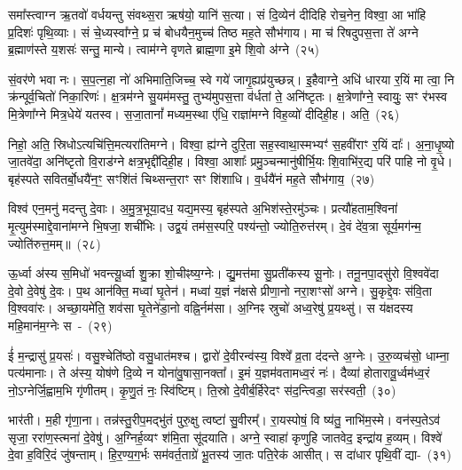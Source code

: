 {\anuvakamend[{पत्नी॑रि॒माꣳ रु॒द्रास्त्वाऽऽ च्छृ॑न्द॒न्त्वेका॒न्नविꣳ॑श॒तिश्च॑}]}%

समा᳚स्त्वाग्न ऋ॒तवो॑ वर्धयन्तु संवथ्स॒रा ऋष॑यो॒ यानि॑ स॒त्या। सं दि॒व्येन॑ दीदिहि रोच॒नेन॒ विश्वा॒ आ भा॑हि प्र॒दिशः॑ पृथि॒व्याः। सं चे॒ध्यस्वा᳚ग्ने॒ प्र च॑ बोधयैन॒मुच्च॑ तिष्ठ मह॒ते सौभ॑गाय। मा च॑ रिषदुपस॒त्ता ते॑ अग्ने ब्र॒ह्माण॑स्ते य॒शसः॑ सन्तु॒ मान्ये। त्वाम॑ग्ने वृणते ब्राह्म॒णा इ॒मे शि॒वो अ॑ग्ने~(२५)

सं॒वर॑णे भवा नः। स॒प॒त्न॒हा नो॑ अभिमाति॒जिच्च॒ स्वे गये॑ जागृ॒ह्यप्र॑युच्छन्न्। इ॒हैवाग्ने॒ अधि॑ धारया र॒यिं मा त्वा॒ नि क्र॑न्पूर्व॒चितो॑ निका॒रिणः॑। क्ष॒त्रम॑ग्ने सु॒यम॑मस्तु॒ तुभ्य॑मुपस॒त्ता व॑र्धतां ते॒ अनि॑ष्टृतः। क्ष॒त्रेणा᳚ग्ने॒ स्वायुः॒ सꣳ र॑भस्व मि॒त्रेणा᳚ग्ने मित्र॒धेये॑ यतस्व। स॒जा॒तानां᳚ मध्यम॒स्था ए॑धि॒ राज्ञा॑मग्ने विह॒व्यो॑ दीदिही॒ह। अति॒~(२६)

निहो॒ अति॒ स्रिधो\-ऽत्यचि॑त्ति॒मत्यरा॑तिमग्ने। विश्वा॒ ह्य॑ग्ने दुरि॒ता सह॒स्वाथा॒स्मभ्यꣳ॑ स॒हवी॑राꣳ र॒यिं दाः᳚। अ॒ना॒धृ॒ष्यो जा॒तवे॑दा॒ अनि॑ष्टृतो वि॒राड॑ग्ने क्षत्र॒भृद्दी॑दिही॒ह। विश्वा॒ आशाः᳚ प्रमु॒ञ्चन्मानु॑षीर्भि॒यः शि॒वाभि॑र॒द्य परि॑ पाहि नो वृ॒धे। बृह॑स्पते सवितर्बो॒धयै॑न॒ꣳ॒ सꣳशि॑तं चिथ्सन्त॒राꣳ सꣳ शि॑शाधि। व॒र्धयै॑नं मह॒ते सौभ॑गाय॒~(२७)

विश्व॑ एन॒मनु॑ मदन्तु दे॒वाः। अ॒मु॒त्र॒भूया॒दध॒ यद्य॒मस्य॒ बृह॑स्पते अ॒भिश॑स्ते॒रमु॑ञ्चः। प्रत्यौ॑हताम॒श्विना॑ मृ॒त्युम॑स्माद्दे॒वाना॑मग्ने भि॒षजा॒ शची॑भिः। उद्व॒यं तम॑स॒स्परि॒ पश्य॑न्तो॒ ज्योति॒रुत्त॑रम्। दे॒वं दे॑व॒त्रा सूर्य॒मग॑न्म॒ ज्योति॑रुत्त॒मम्॥~(२८)

{\anuvakamend[{इ॒मे शि॒वो अ॒ग्ने\-ऽति॒ सौभ॑गाय॒ चतु॑स्त्रिꣳशच्च}]}%

ऊ॒र्ध्वा अ॑स्य स॒मिधो॑ भवन्त्यू॒र्ध्वा शु॒क्रा शो॒चीꣴष्य॒ग्नेः। द्यु॒मत्त॑मा सु॒प्रती॑कस्य सू॒नोः। तनू॒नपा॒दसु॑रो वि॒श्ववे॑दा दे॒वो दे॒वेषु॑ दे॒वः। प॒थ आन॑क्ति॒ मध्वा॑ घृ॒तेन॑। मध्वा॑ य॒ज्ञं न॑क्षसे प्रीणा॒नो नरा॒शꣳसो॑ अग्ने। सु॒कृद्दे॒वः स॑वि॒ता वि॒श्ववा॑रः। अच्छा॒यमे॑ति॒ शव॑सा घृ॒तेने॑डा॒नो वह्नि॒र्नम॑सा। अ॒ग्निꣴ स्रुचो॑ अध्व॒रेषु॑ प्र॒यथ्सु॑। स य॑क्षदस्य महि॒मान॑म॒ग्नेः स~-~(२९)

ई॑ म॒न्द्रासु॑ प्र॒यसः॑। वसु॒श्चेति॑ष्ठो वसु॒धात॑मश्च। द्वारो॑ दे॒वीरन्व॑स्य॒ विश्वे᳚ व्र॒ता द॑दन्ते अ॒ग्नेः। उ॒रु॒व्यच॑सो॒ धाम्ना॒ पत्य॑मानाः। ते अ॑स्य॒ योष॑णे दि॒व्ये न योना॑वु॒षासा॒नक्ता᳚। इ॒मं य॒ज्ञम॑वतामध्व॒रं नः॑। दैव्या॑ होतारावू॒र्ध्वम॑ध्व॒रं नो॒\-ऽग्नेर्जि॒ह्वाम॒भि गृ॑णीतम्। कृ॒णु॒तं नः॒ स्वि॑ष्टिम्। ति॒स्रो दे॒वीर्ब॒र्हिरेदꣳ स॑द॒न्त्विडा॒ सर॑स्वती॒~(३०)

भार॑ती। म॒ही गृ॑णा॒ना। तन्न॑स्तु॒रीप॒मद्भु॑तं पुरु॒क्षु त्वष्टा॑ सु॒वीरम्᳚। रा॒यस्पोषं॒ वि ष्य॑तु॒ नाभि॑म॒स्मे। वन॑स्प॒ते\-ऽव॑ सृजा॒ ररा॑ण॒स्त्मना॑ दे॒वेषु॑। अ॒ग्निर्\mbox{}ह॒व्यꣳ श॑मि॒ता सू॑दयाति। अग्ने॒ स्वाहा॑ कृणुहि जातवेद॒ इन्द्रा॑य ह॒व्यम्। विश्वे॑ दे॒वा ह॒विरि॒दं जु॑षन्ताम्। हि॒र॒ण्य॒ग॒र्भः सम॑वर्त॒ताग्रे॑ भू॒तस्य॑ जा॒तः पति॒रेक॑ आसीत्। स दा॑धार पृथि॒वीं द्या-~(३१)

